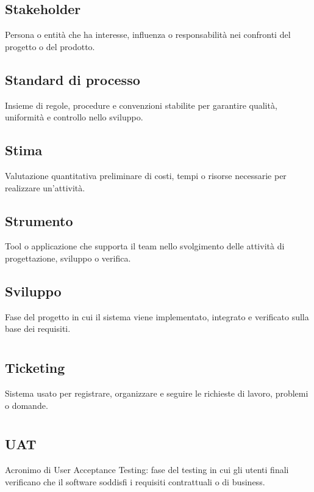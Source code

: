 \documentclass[a4paper,12pt]{article}
\begin{document}
          \subsection*{Stakeholder}
			Persona o entità che ha interesse, influenza o responsabilità nei confronti del progetto o del prodotto.
          \subsection*{Standard di processo}
			Insieme di regole, procedure e convenzioni stabilite per garantire qualità, uniformità e controllo nello sviluppo.
          \subsection*{Stima}
			Valutazione quantitativa preliminare di costi, tempi o risorse necessarie per realizzare un'attività.
          \subsection*{Strumento}
			Tool o applicazione che supporta il team nello svolgimento delle attività di progettazione, sviluppo o verifica.
          \subsection*{Sviluppo}
			Fase del progetto in cui il sistema viene implementato, integrato e verificato sulla base dei requisiti.
        
\newpage
        \section{}
        
          \subsection*{Ticketing}
			Sistema usato per registrare, organizzare e seguire le richieste di lavoro, problemi o domande.
        
\newpage
        \section{}
        
          \subsection*{UAT}
			Acronimo di User Acceptance Testing: fase del testing in cui gli utenti finali verificano che il software soddisfi i requisiti contrattuali o di business.
\end{document}

